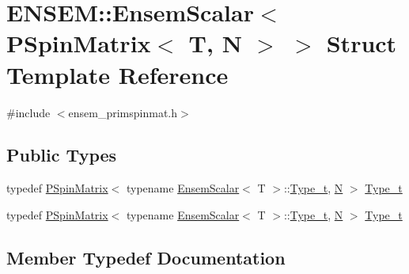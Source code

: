 \hypertarget{structENSEM_1_1EnsemScalar_3_01PSpinMatrix_3_01T_00_01N_01_4_01_4}{}\section{E\+N\+S\+EM\+:\+:Ensem\+Scalar$<$ P\+Spin\+Matrix$<$ T, N $>$ $>$ Struct Template Reference}
\label{structENSEM_1_1EnsemScalar_3_01PSpinMatrix_3_01T_00_01N_01_4_01_4}


{\ttfamily \#include $<$ensem\+\_\+primspinmat.\+h$>$}

\subsection*{Public Types}
\begin{DoxyCompactItemize}
\item 
typedef \mbox{\hyperlink{classENSEM_1_1PSpinMatrix}{P\+Spin\+Matrix}}$<$ typename \mbox{\hyperlink{structENSEM_1_1EnsemScalar}{Ensem\+Scalar}}$<$ T $>$\+::\mbox{\hyperlink{structENSEM_1_1EnsemScalar_3_01PSpinMatrix_3_01T_00_01N_01_4_01_4_a45d77e25a68437833d711402b4dfd773}{Type\+\_\+t}}, \mbox{\hyperlink{operator__name__util_8cc_a7722c8ecbb62d99aee7ce68b1752f337}{N}} $>$ \mbox{\hyperlink{structENSEM_1_1EnsemScalar_3_01PSpinMatrix_3_01T_00_01N_01_4_01_4_a45d77e25a68437833d711402b4dfd773}{Type\+\_\+t}}
\item 
typedef \mbox{\hyperlink{classENSEM_1_1PSpinMatrix}{P\+Spin\+Matrix}}$<$ typename \mbox{\hyperlink{structENSEM_1_1EnsemScalar}{Ensem\+Scalar}}$<$ T $>$\+::\mbox{\hyperlink{structENSEM_1_1EnsemScalar_3_01PSpinMatrix_3_01T_00_01N_01_4_01_4_a45d77e25a68437833d711402b4dfd773}{Type\+\_\+t}}, \mbox{\hyperlink{operator__name__util_8cc_a7722c8ecbb62d99aee7ce68b1752f337}{N}} $>$ \mbox{\hyperlink{structENSEM_1_1EnsemScalar_3_01PSpinMatrix_3_01T_00_01N_01_4_01_4_a45d77e25a68437833d711402b4dfd773}{Type\+\_\+t}}
\end{DoxyCompactItemize}


\subsection{Member Typedef Documentation}
\mbox{\label{structENSEM_1_1EnsemScalar_3_01PSpinMatrix_3_01T_00_01N_01_4_01_4_a45d77e25a68437833d711402b4dfd773}} 
